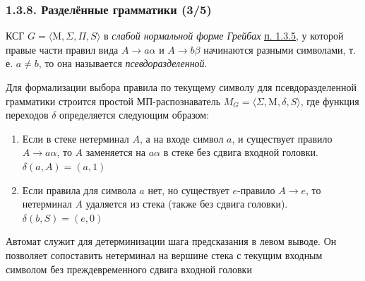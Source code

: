 \documentclass[mathserif,12pt,aspectratio=169]{beamer}
\renewcommand{\index}[1]{}
\def\odmkey#1#2{{\it\color{red} #1}\index{#2}}
\def\DMref#1#2{{\color{blue}\underline{\hyperlink{#2}{#1}}}}
\begin{document}
\begin{frame}
\frametitle{1.3.8. Разделённые грамматики (3/5)}

КСГ $G=\langle \mathrm{M}, \Sigma, \Pi, S \rangle$ в \odmkey{слабой нормальной форме Грейбах}{Грамматика!в слабой нормальной форме Грейбах} \DMref{п. 1.3.5}{1.3.5.}, у которой правые части правил вида \( A \to a\alpha \) и \( A \to b\beta \) начинаются разными символами, т. е. \( a \neq b \), то она называется \odmkey{псевдоразделенной}{Псевдоразделенная!Грамматика}.

Для формализации выбора правила по текущему символу для псевдоразделенной грамматики строится простой МП-распознаватель \( M_G = \langle \Sigma, \mathrm{M}, \delta, S \rangle \), где функция переходов \( \delta \) определяется следующим образом:
\begin{enumerate}
  \item Если в стеке нетерминал \( A \), а на входе символ \( a \), и существует правило \( A \to a\alpha \), то \( A \) заменяется на \( a\alpha \) в стеке без сдвига входной головки. \(\delta(a, A) = (a, 1)\)
  \item Если правила для символа \( a \) нет, но существует \( e \)-правило \( A \to e \), то нетерминал \( A \) удаляется из стека (также без сдвига головки). \(\delta(b, S) = (e, 0)\)
\end{enumerate}
Автомат служит для детерминизации шага предсказания в левом выводе. Он позволяет сопоставить нетерминал на вершине стека с текущим входным символом без преждевременного сдвига входной головки
\end{frame}
\end{document}
